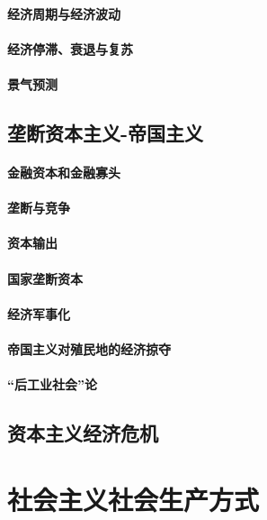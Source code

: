 \documentclass[UTF8]{../../RepresentationUniverse}
\begin{document}
    \subsubsection{经济周期与经济波动}
    \subsubsection{经济停滞、衰退与复苏}
    \subsubsection{景气预测}
\section{垄断资本主义-帝国主义}
    \subsubsection{金融资本和金融寡头}
    \subsubsection{垄断与竞争}
    \subsubsection{资本输出}
    \subsubsection{国家垄断资本}
    \subsubsection{经济军事化}
    \subsubsection{帝国主义对殖民地的经济掠夺}
    \subsubsection{“后工业社会”论}
\section{资本主义经济危机}




\chapter{社会主义社会生产方式}
\end{document}
